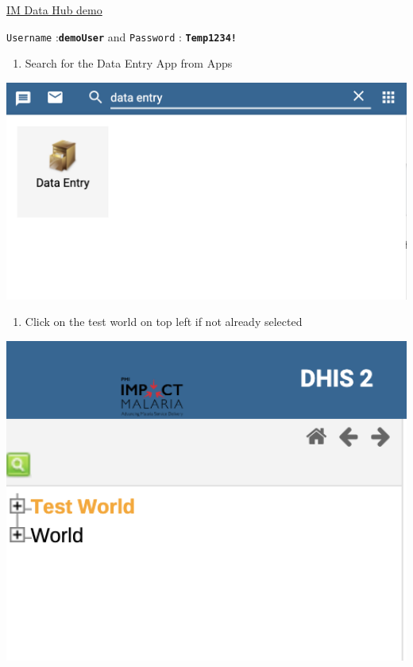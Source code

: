 \documentclass[]{book}
\providecommand{\tightlist}{%
  \setlength{\itemsep}{0pt}\setlength{\parskip}{0pt}}
\begin{document}
\href{https://im-dev.psi-mis.org/dhis-web-dataentry/index.action}{IM Data Hub demo}

\texttt{Username} :\textbf{\texttt{demoUser}} and \texttt{Password} : \textbf{\texttt{Temp1234!}}

\begin{enumerate}
\def\labelenumi{\arabic{enumi}.}
\setcounter{enumi}{1}
\tightlist
\item
  Search for the Data Entry App from Apps
\end{enumerate}

\includegraphics[width=15.28in]{./images/data-entry-app2}

\begin{enumerate}
\def\labelenumi{\arabic{enumi}.}
\setcounter{enumi}{2}
\tightlist
\item
  Click on the test world on top left if not already selected
\end{enumerate}

\includegraphics[width=6.58in]{./images/test-world}
\end{document}
